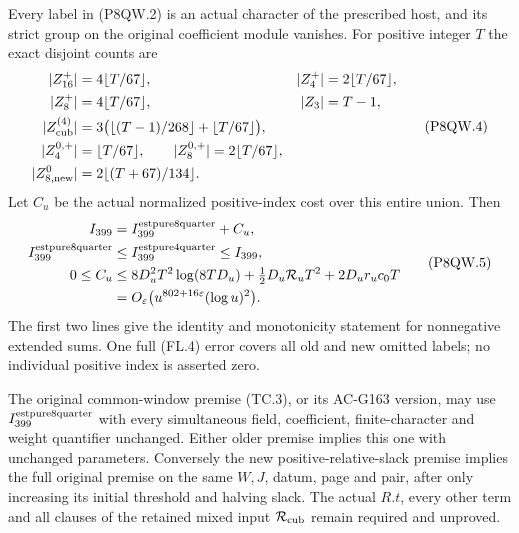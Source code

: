 \begin{theorem}
\label{AC-G165-window}
Every label in (P8QW.2) is an actual character of the prescribed
host, and its strict group on the original coefficient module
vanishes.  For positive integer $T$ the exact disjoint counts are
\[
 \begin{aligned}
 |Z_{16}^+|&=4\lfloor T/67\rfloor,& |Z_4^+|&=2\lfloor T/67\rfloor,\\
 |Z_8^+|&=4\lfloor T/67\rfloor,& |Z_3|&=T-1,\\
 |Z_{\rm cub}^{(4)}|&=3\bigl(\lfloor(T-1)/268\rfloor
                                      +\lfloor T/67\rfloor\bigr),\\
 |Z_4^{0,+}|&=\lfloor T/67\rfloor,\qquad
 |Z_8^{0,+}|=2\lfloor T/67\rfloor,\\
 |Z_{8,\mathrm{new}}^0|&=2\lfloor(T+67)/134\rfloor.
 \end{aligned}
 \tag{P8QW.4}
\]
Let $C_u$ be the actual normalized positive-index cost over
this entire union.  Then
\[
 \begin{aligned}
 I_{399}&=I_{399}^{\rm estpure8quarter}+C_u,\\
 I_{399}^{\rm estpure8quarter}&\leq I_{399}^{\rm estpure4quarter}\leq I_{399},\\
 0\leq C_u&\leq8D_u^2T^2\log(8TD_u)
                   +\tfrac12D_u\mathcal R_uT^2+2D_ur_uc_0T\\
 &=O_\varepsilon\bigl(u^{802+16\varepsilon}(\log u)^2\bigr).
 \end{aligned}
 \tag{P8QW.5}
\]
The first two lines give the identity and monotonicity statement for
nonnegative extended sums.
One full (FL.4) error covers all old and new omitted labels;
no individual positive index is asserted zero.

The original common-window premise (TC.3), or its AC-G163 version,
may use $I_{399}^{\rm estpure8quarter}$ with every simultaneous field,
coefficient, finite-character and weight quantifier unchanged.
Either older premise implies this one with unchanged parameters.
Conversely the new positive-relative-slack premise implies the
full original premise on the same $W,J$, datum, page and pair,
after only increasing its initial threshold and halving slack.
The actual $R.t$, every other term and all clauses of the retained
mixed input $\mathcal R_{\rm cub}$ remain required and unproved.
\end{theorem}

